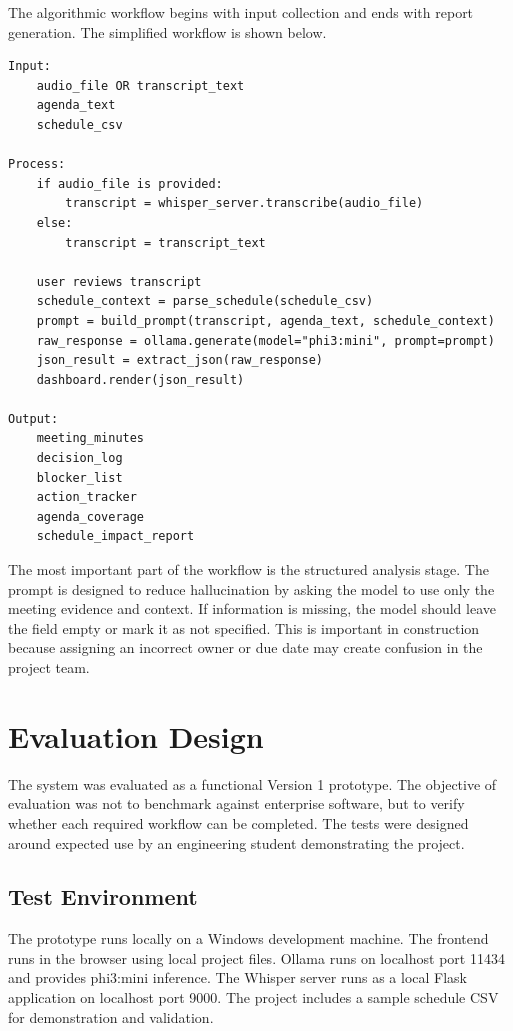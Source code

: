\documentclass[11pt,a4paper]{article}
\begin{document}
The algorithmic workflow begins with input collection and ends with report generation. The simplified workflow is shown below.

\begin{verbatim}
Input:
    audio_file OR transcript_text
    agenda_text
    schedule_csv

Process:
    if audio_file is provided:
        transcript = whisper_server.transcribe(audio_file)
    else:
        transcript = transcript_text

    user reviews transcript
    schedule_context = parse_schedule(schedule_csv)
    prompt = build_prompt(transcript, agenda_text, schedule_context)
    raw_response = ollama.generate(model="phi3:mini", prompt=prompt)
    json_result = extract_json(raw_response)
    dashboard.render(json_result)

Output:
    meeting_minutes
    decision_log
    blocker_list
    action_tracker
    agenda_coverage
    schedule_impact_report
\end{verbatim}

The most important part of the workflow is the structured analysis stage. The prompt is designed to reduce hallucination by asking the model to use only the meeting evidence and context. If information is missing, the model should leave the field empty or mark it as not specified. This is important in construction because assigning an incorrect owner or due date may create confusion in the project team.

\section{Evaluation Design}

The system was evaluated as a functional Version 1 prototype. The objective of evaluation was not to benchmark against enterprise software, but to verify whether each required workflow can be completed. The tests were designed around expected use by an engineering student demonstrating the project.

\subsection{Test Environment}

The prototype runs locally on a Windows development machine. The frontend runs in the browser using local project files. Ollama runs on localhost port 11434 and provides phi3:mini inference. The Whisper server runs as a local Flask application on localhost port 9000. The project includes a sample schedule CSV for demonstration and validation.
\end{document}
